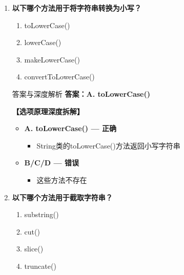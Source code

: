 \documentclass[12pt, a4paper]{ctexart}
\begin{document}
\begin{enumerate}[label=\textbf{\arabic*.}]
\begin{bluebox}{答案与深度解析}
\begin{itemize}[label={}, leftmargin=*, nosep]
\begin{itemize}[label={}, nosep]
			      \item 这些方法不存在
		      
		      

	      
					  \end{itemize}
					  \end{itemize}
\end{bluebox}

	      \vspace{1em}

	\item \textbf{以下哪个方法用于将字符串转换为小写？}
	      \begin{enumerate}[label=\Alph*.]
		      \item toLowerCase()
		      \item lowerCase()
		      \item makeLowerCase()
		      \item convertToLowerCase()
	      \end{enumerate}

	      \begin{bluebox}{答案与深度解析}
		      \textbf{答案：A. toLowerCase()}

		      \textbf{【选项原理深度拆解】}
					  \begin{itemize}[label={}, leftmargin=*, nosep]


		      \item \textbf{A. toLowerCase() — 正确}
					  \begin{itemize}[label={}, nosep]
		      
			      \item String类的toLowerCase()方法返回小写字符串

					  \end{itemize}
		      \item \textbf{B/C/D — 错误}
					  \begin{itemize}[label={}, nosep]
		      
			      \item 这些方法不存在
		      
		      

	      
					  \end{itemize}
					  \end{itemize}
\end{bluebox}

	      \vspace{1em}

	\item \textbf{以下哪个方法用于截取字符串？}
	      \begin{enumerate}[label=\Alph*.]
		      \item substring()
		      \item cut()
		      \item slice()
		      \item truncate()
	      \end{enumerate}


\end{enumerate}
\end{document}
